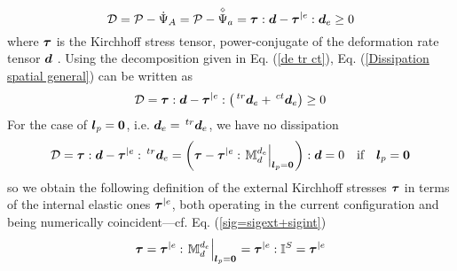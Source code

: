 \documentclass[preprint,review,12pt,sort&compress]{elsarticle}%
\newcommand{\lpo}[0]{\scriptsize\mathbf{l}_p = \mathbf{0}\normalsize\mathbf{}}
\renewcommand{\mathbf}[1]{\mbox{\boldmath $#1$ \unboldmath}  \!\!}
\begin{document}
\begin{equation}
\mathcal{D}=\mathcal{P}-\dot{\Psi}_{A}=\mathcal{P}-\overset{\diamond}{\Psi
}_{a}=\mathbf{\tau}:\mathbf{d}-\mathbf{\tau}^{|e}:\mathbf{d}_{e}\geq0
\label{Dissipation spatial general}%
\end{equation}
where $\mathbf{\tau}$ is the Kirchhoff stress tensor, power-conjugate of the
deformation rate tensor $\mathbf{d}$ \cite{LatMonAPM2016}. Using the
decomposition given in Eq. (\ref{de tr ct}), Eq.
(\ref{Dissipation spatial general}) can be written as%
\begin{equation}
\mathcal{D}=\mathbf{\tau}:\mathbf{d}-\mathbf{\tau}^{|e}:\left(  \,^{tr}%
\mathbf{d}_{e}+\,^{ct}\mathbf{d}_{e}\right)  \geq0 \label{Dissipationd}%
\end{equation}
For the case of $\mathbf{l}_{p}=\mathbf{0}$, i.e. $\mathbf{d}_{e}%
=\,^{tr}\mathbf{d}_{e}$, we have no dissipation%
\begin{equation}
\mathcal{D}=\mathbf{\tau}:\mathbf{d}-\mathbf{\tau}^{|e}:\,^{tr}\mathbf{d}%
_{e}=\left(  \mathbf{\tau}-\mathbf{\tau}^{|e}:\left.  \mathbb{M}_{d}^{d_{e}%
}\right\vert _{%
\lpo
}\right)  :\mathbf{d}=0\quad\text{if}\quad\mathbf{l}_{p}=\mathbf{0}%
\end{equation}
so we obtain the following definition of the external Kirchhoff stresses
$\mathbf{\tau}$ in terms of the internal elastic ones $\mathbf{\tau}^{|e}$,
both operating in the current configuration and being numerically
coincident---cf. Eq. (\ref{sig=sigext+sigint})%
\begin{equation}
\mathbf{\tau}=\mathbf{\tau}^{|e}:\left.  \mathbb{M}_{d}^{d_{e}}\right\vert _{%
\lpo
}=\mathbf{\tau}^{|e}:\mathbb{I}^{S}=\mathbf{\tau}^{|e}
\label{tau=tauext+tauint}%
\end{equation}
\end{document}
